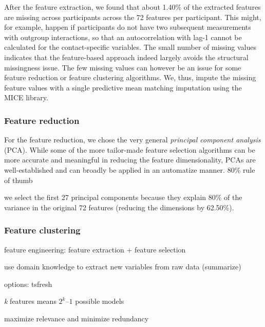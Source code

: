 After the feature extraction, we found that about 1.40\% of the
extracted features are missing across participants across the 72
features per participant. This might, for example, happen if
participants do not have two subsequent measurements with outgroup
interactions, so that an autocorrelation with lag-1 cannot be calculated
for the contact-specific variables. The small number of missing values
indicates that the feature-based approach indeed largely avoids the
structural missingness issue. The few missing values can however be an
issue for some feature reduction or feature clustering algorithms. We,
thus, impute the missing feature values with a single predictive mean
matching imputation using the MICE library.

\subsubsection{Feature reduction}

For the feature reduction, we chose the very general
\textit{principal component analysis} (PCA). While some of the more
tailor-made feature selection algorithms can be more accurate and
meaningful in reducing the feature dimensionality, PCAs are
well-established and can broadly be applied in an automatize manner.
80\% rule of thumb

we select the first 27 principal components because they explain 80\% of
the variance in the original 72 features (reducing the dimensions by
62.50\%).

\subsubsection{Feature clustering}

feature engineering: feature extraction + feature selection

use domain knowledge to extract new variables from raw data (summarize)

options: tsfresh \citep[][]{christ2018}

\textit{k} features means \(2^k – 1\) possible models

maximize relevance and minimize redundancy

